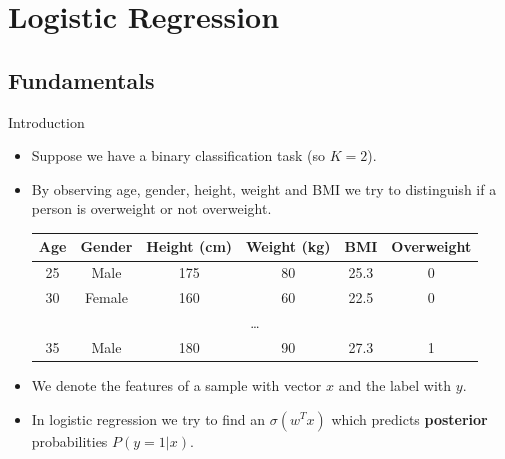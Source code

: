 \documentclass[serif, aspectratio=169]{beamer}
\begin{document}
\section{Logistic Regression}

\subsection{Fundamentals}


\begin{frame}{Introduction}
    \begin{itemize}
        \item Suppose we have a binary classification task (so $K=2$).
        \item By observing \textcolor{deepred}{age}, \textcolor{deepred}{gender}, \textcolor{deepred}{height}, \textcolor{deepred}{weight} and \textcolor{deepred}{BMI} we try to distinguish if a person is \textcolor{deepgreen}{overweight} or \textcolor{deepgreen}{not overweight}.
        
        
        \begin{table}[h!]
        \centering
        \begin{tabular}{|c|c|c|c|c|c|}
        \hline
        \textcolor{deepred}{Age} & \textcolor{deepred}{Gender} & \textcolor{deepred}{Height (cm)} & \textcolor{deepred}{Weight (kg)} & \textcolor{deepred}{BMI} & \textcolor{deepgreen}{Overweight} \\ \hline
        25 & Male & 175 & 80 & 25.3 & 0 \\ \hline
        30 & Female & 160 & 60 & 22.5 & 0 \\ \hline
        \multicolumn{6}{|c|}{\dots} \\ \hline
        35 & Male & 180 & 90 & 27.3 & 1 \\ \hline
        \end{tabular}
        \end{table}
        \item We denote the \textcolor{deepred}{features} of a sample with vector $x$ and the \textcolor{deepgreen}{label} with $y$.
        \item In logistic regression we try to find an $\sigma (w^Tx)$ which predicts \textbf{posterior} probabilities $P(y=1|x)$.
    \end{itemize}
    
\end{frame}
\end{document}

